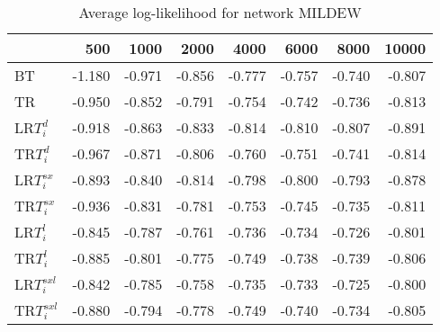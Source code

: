 \begin{table}
 \begin{center}
 \begin{tabular}{lrrrrrrr}
 & 500 & 1000 & 2000 & 4000 & 6000 & 8000 & 10000\\\hline
BT & -1.180 & -0.971 & -0.856 & -0.777 & -0.757 & -0.740 & -0.807\\\hline
TR & -0.950 & -0.852 & -0.791 & -0.754 & -0.742 & -0.736 & -0.813\\\hline
LR$T_i^d$ & -0.918 & -0.863 & -0.833 & -0.814 & -0.810 & -0.807 & -0.891\\\hline
TR$T_i^d$ & -0.967 & -0.871 & -0.806 & -0.760 & -0.751 & -0.741 & -0.814\\\hline
LR$T_i^{sx}$ & -0.893 & -0.840 & -0.814 & -0.798 & -0.800 & -0.793 & -0.878\\\hline
TR$T_i^{sx}$ & -0.936 & -0.831 & -0.781 & -0.753 & -0.745 & -0.735 & -0.811\\\hline
LR$T_i^l$ & -0.845 & -0.787 & -0.761 & -0.736 & -0.734 & -0.726 & -0.801\\\hline
TR$T_i^l$ & -0.885 & -0.801 & -0.775 & -0.749 & -0.738 & -0.739 & -0.806\\\hline
LR$T_i^{sxl}$ & -0.842 & -0.785 & -0.758 & -0.735 & -0.733 & -0.725 & -0.800\\\hline
TR$T_i^{sxl}$ & -0.880 & -0.794 & -0.778 & -0.749 & -0.740 & -0.734 & -0.805\\\hline
\end{tabular}
\end{center}
\caption{Average log-likelihood for network MILDEW }
\label{Mildewll}
\end{table}


